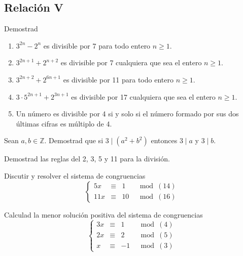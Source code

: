 \subsection{Relación V}
\begin{ejercicio}
    Demostrad
    \begin{enumerate}
        \item $3^{2n}-2^n$ es divisible por 7 para todo entero $n\geq 1$.
        \item $3^{2n+1} + 2^{n+2}$ es divisible por 7 cualquiera que sea el entero $n\geq 1$.
        \item $3^{2n+2}+2^{6n+1}$ es divisible por 11 para todo entero $n\geq 1$.
        \item $3\cdot 5^{2n+1}+2^{3n+1}$ es divisible por 17 cualquiera que sea el entero $n\geq 1$.
        \item Un número es divisible por 4 si y solo si el número formado por sus dos últimas cifras es múltiplo de 4.
    \end{enumerate}
\end{ejercicio}

\begin{ejercicio}
    Sean $a,b\in \mathbb{Z}$. Demostrad que si $3\mid (a^2 + b^2)$ entonces $3\mid a$ y $3\mid b$.
\end{ejercicio}

\begin{ejercicio}
    Demostrad las reglas del 2, 3, 5 y 11 para la división.
\end{ejercicio}

\begin{ejercicio}
    Discutir y resolver el sistema de congruencias
    \begin{equation*}
        \left\{\begin{array}{cccc}
                5x & \equiv & 1 & \mod (14) \\
                11x & \equiv & 10 & \mod(16)
        \end{array}\right.
    \end{equation*}
\end{ejercicio}

\begin{ejercicio}
    Calculad la menor solución positiva del sistema de congruencias
    \begin{equation*}
        \left\{\begin{array}{cccc}
                3x & \equiv & 1 & \mod (4) \\
                2x & \equiv & 2 & \mod(5) \\
                x & \equiv & -1 & \mod(3)
        \end{array}\right.
    \end{equation*}
\end{ejercicio}

